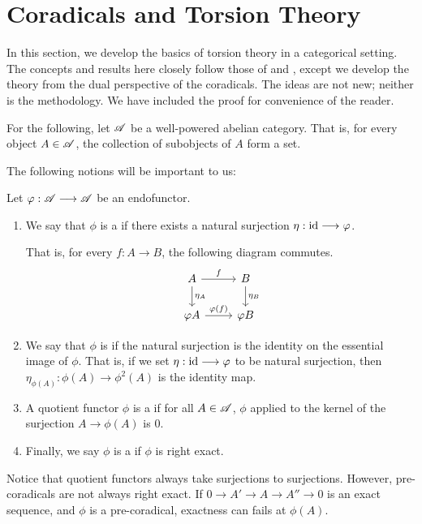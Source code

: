 \newpage
\section{Coradicals and Torsion Theory}\label{sect_torsion_theory}

In this section, we develop the basics of torsion theory in a 
categorical setting. The concepts and results here closely follow
those of \cite{BJV} and \cite{DTor}, except we develop the theory
from the dual perspective of the coradicals. The ideas are not new;
neither is the methodology. We have included the proof for 
convenience of the reader.

For the following, let $\mathscr{A}$ be a well-powered abelian category.
That is, for every object $A \in \mathscr{A}$, the collection of 
subobjects of $A$ form a set.

The following notions will be important to us:

\begin{defn}\label{def_coradical}
Let $\varphi: \mathscr{A} \longrightarrow \mathscr{A}$ be an endofunctor. 
\begin{enumerate}
\item We say that $\phi$ is a  if there 
exists a natural surjection $\eta: \mathrm{id} \longrightarrow \varphi$. 

That is, for every $f: A \to B$, the following diagram commutes.
\[
\begin{tikzcd}
A \arrow{r}{f} \arrow{d}{\eta_A} &
B \arrow{d}{\eta_B} \\
\phi A \arrow{r}{\phi(f)} 
&\phi B
\end{tikzcd}
\]

\item We say that $\phi$ is  if the natural 
surjection is the identity on the essential image of $\phi$.
That is, if we set $\eta: \mathrm{id} \longrightarrow \varphi$ to be natural surjection,
then $\eta_{\phi(A)}: \phi(A) \to \phi^2(A)$ is the identity map.

\item A quotient functor $\phi$ is a  if for all
$A \in \mathscr{A}$, $\phi$ applied to the kernel of the surjection 
$A \to \phi(A)$ is $0$.

\item Finally, we say $\phi$ is a  if $\phi$ is
right exact.
\end{enumerate}
\end{defn}

\begin{rmk}
Notice that quotient functors always take surjections to 
surjections. However, pre-coradicals are not always right exact.
If $0 \to A' \to A \to A'' \to 0$ is an exact sequence, and $\phi$
is a pre-coradical, exactness can fails at $\phi(A)$.
\end{rmk}

